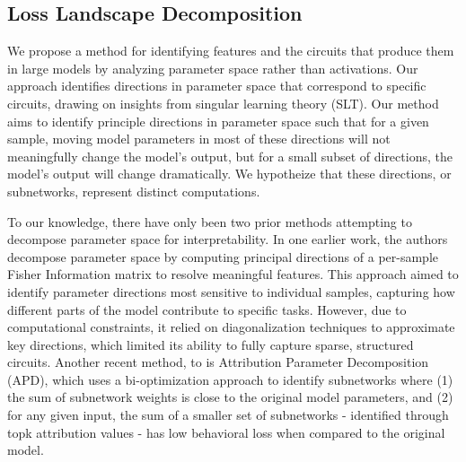 \documentclass{article}
\theoremstyle{plain}
\theoremstyle{definition}
\theoremstyle{remark}
\begin{document}
\subsection{Loss Landscape Decomposition}


We propose a method for identifying features and the circuits that produce them in large models by analyzing parameter space rather than activations. Our approach identifies directions in parameter space that correspond to specific circuits, drawing on insights from singular learning theory (SLT). Our method aims to identify principle directions in parameter space such that for a given sample, moving model parameters in most of these directions will not meaningfully change the model's output, but for a small subset of directions, the model's output will change dramatically. We hypotheize that these directions, or subnetworks, represent distinct computations. 

To our knowledge, there have only been two prior methods attempting to decompose parameter space for interpretability. In one earlier work\cite{matena2023npeff}, the authors decompose parameter space by computing principal directions of a per-sample Fisher Information matrix to resolve meaningful features. This approach aimed to identify parameter directions most sensitive to individual samples, capturing how different parts of the model contribute to specific tasks. However, due to computational constraints, it relied on diagonalization techniques to approximate key directions, which limited its ability to fully capture sparse, structured circuits. Another recent method, \cite{braun2025interpretability} to is Attribution Parameter Decomposition (APD), which uses a bi-optimization approach to identify subnetworks where (1) the sum of subnetwork weights is close to the original model parameters, and (2) for any given input, the sum of a smaller set of subnetworks - identified through topk attribution values - has low behavioral loss when compared to the original model.  

\end{document}
